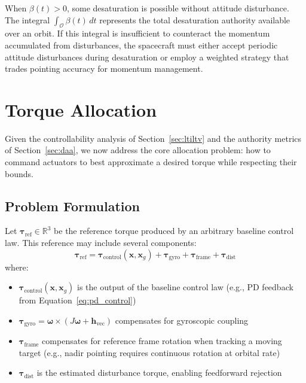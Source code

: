 \documentclass[conference]{IEEEtran}
\begin{document}
When $\beta(t) > 0$, some desaturation is possible without attitude disturbance. The integral $\int_{\mathcal{O}} \beta(t) \, dt$ represents the total desaturation authority available over an orbit. If this integral is insufficient to counteract the momentum accumulated from disturbances, the spacecraft must either accept periodic attitude disturbances during desaturation or employ a weighted strategy that trades pointing accuracy for momentum management.

\section{Torque Allocation}\label{sec:allocation}

Given the controllability analysis of Section~\ref{sec:ltiltv} and the authority metrics of Section~\ref{sec:daa}, we now address the core allocation problem: how to command actuators to best approximate a desired torque while respecting their bounds.

\subsection{Problem Formulation}
Let $\boldsymbol{\tau}_{\text{ref}} \in \mathbb{R}^3$ be the reference torque produced by an arbitrary baseline control law. This reference may include several components:
\begin{equation}
    \boldsymbol{\tau}_{\text{ref}} = \boldsymbol{\tau}_{\text{control}}(\mathbf{x}, \mathbf{x}_g) + \boldsymbol{\tau}_{\text{gyro}} + \boldsymbol{\tau}_{\text{frame}} + \boldsymbol{\tau}_{\text{dist}}
    \label{eq:tau_ref}
\end{equation}
where:
\begin{itemize}
    \item $\boldsymbol{\tau}_{\text{control}}(\mathbf{x}, \mathbf{x}_g)$ is the output of the baseline control law (e.g., PD feedback from Equation~\ref{eq:pd_control})
    \item $\boldsymbol{\tau}_{\text{gyro}} = \boldsymbol{\omega} \times (J\boldsymbol{\omega} + \mathbf{h}_{\text{vec}})$ compensates for gyroscopic coupling
    \item $\boldsymbol{\tau}_{\text{frame}}$ compensates for reference frame rotation when tracking a moving target (e.g., nadir pointing requires continuous rotation at orbital rate)
    \item $\boldsymbol{\tau}_{\text{dist}}$ is the estimated disturbance torque, enabling feedforward rejection
\end{itemize}
\end{document}
